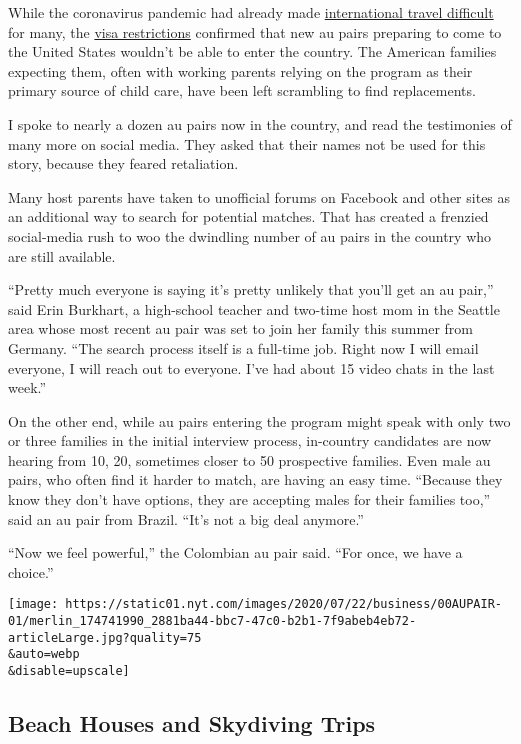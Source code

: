 While the coronavirus pandemic had already made
\href{https://www.nytimes.com/2020/05/13/us/politics/trump-coronavirus-border-restrictions.html?action=click\&module=RelatedLinks\&pgtype=Article}{international
travel difficult} for many, the
\href{https://www.nytimes.com/2020/06/12/us/politics/coronavirus-trump-immigration-policies.html?action=click\&module=RelatedLinks\&pgtype=Article}{visa
restrictions} confirmed that new au pairs preparing to come to the
United States wouldn't be able to enter the country. The American
families expecting them, often with working parents relying on the
program as their primary source of child care, have been left scrambling
to find replacements.

I spoke to nearly a dozen au pairs now in the country, and read the
testimonies of many more on social media. They asked that their names
not be used for this story, because they feared retaliation.

Many host parents have taken to unofficial forums on Facebook and other
sites as an additional way to search for potential matches. That has
created a frenzied social-media rush to woo the dwindling number of au
pairs in the country who are still available.

``Pretty much everyone is saying it's pretty unlikely that you'll get an
au pair,'' said Erin Burkhart, a high-school teacher and two-time host
mom in the Seattle area whose most recent au pair was set to join her
family this summer from Germany. ``The search process itself is a
full-time job. Right now I will email everyone, I will reach out to
everyone. I've had about 15 video chats in the last week.''

On the other end, while au pairs entering the program might speak with
only two or three families in the initial interview process, in-country
candidates are now hearing from 10, 20, sometimes closer to 50
prospective families. Even male au pairs, who often find it harder to
match, are having an easy time. ``Because they know they don't have
options, they are accepting males for their families too,'' said an au
pair from Brazil. ``It's not a big deal anymore.''

``Now we feel powerful,'' the Colombian au pair said. ``For once, we
have a choice.''

\texttt{[image: https://static01.nyt.com/images/2020/07/22/business/00AUPAIR-01/merlin\_174741990\_2881ba44-bbc7-47c0-b2b1-7f9abeb4eb72-articleLarge.jpg?quality=75\\\&auto=webp\\\&disable=upscale]}

\hypertarget{beach-houses-and-skydiving-trips}{%
\subsection{Beach Houses and Skydiving
Trips}\label{beach-houses-and-skydiving-trips}}

